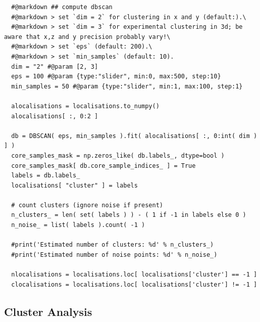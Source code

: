 \documentclass[11pt, a4paper, oneside, twocolumn]{report}
\begin{document}
\begin{verbatim}
  #@markdown ## compute dbscan
  #@markdown > set `dim = 2` for clustering in x and y (default:).\
  #@markdown > set `dim = 3` for experimental clustering in 3d; be aware that x,z and y precision probably vary!\
  #@markdown > set `eps` (default: 200).\
  #@markdown > set `min_samples` (default: 10).
  dim = "2" #@param [2, 3]
  eps = 100 #@param {type:"slider", min:0, max:500, step:10}
  min_samples = 50 #@param {type:"slider", min:1, max:100, step:1}

  alocalisations = localisations.to_numpy()
  alocalisations[ :, 0:2 ]

  db = DBSCAN( eps, min_samples ).fit( alocalisations[ :, 0:int( dim ) ] )
  core_samples_mask = np.zeros_like( db.labels_, dtype=bool )
  core_samples_mask[ db.core_sample_indices_ ] = True
  labels = db.labels_
  localisations[ "cluster" ] = labels

  # count clusters (ignore noise if present)
  n_clusters_ = len( set( labels ) ) - ( 1 if -1 in labels else 0 )
  n_noise_ = list( labels ).count( -1 )

  #print('Estimated number of clusters: %d' % n_clusters_)
  #print('Estimated number of noise points: %d' % n_noise_)

  nlocalisations = localisations.loc[ localisations['cluster'] == -1 ]
  clocalisations = localisations.loc[ localisations['cluster'] != -1 ]
\end{verbatim}


\subsection{Cluster Analysis}
\end{document}
